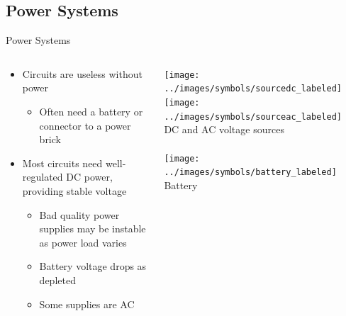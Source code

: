 \documentclass{beamer}
\begin{document}
\subsection{Power Systems}
\begin{frame}{Power Systems}
  \begin{columns}[T]
    \begin{column}{.6\textwidth}
      \begin{itemize}
        \item Circuits are useless without power
        \begin{itemize}
          \item Often need a battery or connector to a power brick
        \end{itemize}
        \item Most circuits need well-regulated DC power, providing stable voltage
        \begin{itemize}
          \item Bad quality power supplies may be instable as power load varies
          \item Battery voltage drops as depleted
          \item Some supplies are AC
        \end{itemize}        
      \end{itemize}
    \end{column}

    \begin{column}{0.4\textwidth} \centering
      \texttt{[image: ../images/symbols/sourcedc\_labeled]}
      \texttt{[image: ../images/symbols/sourceac\_labeled]} \\
      DC and AC voltage sources \\
      ~ \\
      \texttt{[image: ../images/symbols/battery\_labeled]} \\
      Battery
    \end{column}
  \end{columns}
\end{frame}
\end{document}
